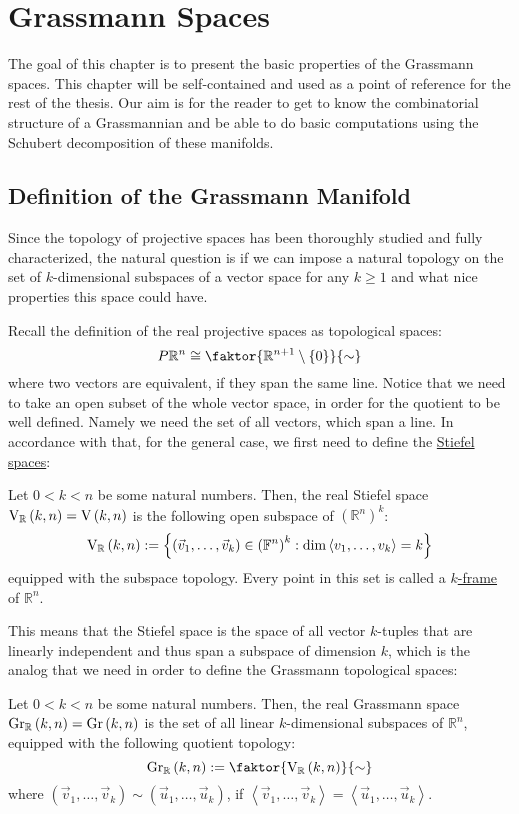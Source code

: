 \chapter{Grassmann Spaces}
The goal of this chapter is to present the basic properties of the Grassmann spaces. This chapter will be self-contained and used as a point of reference for the rest of the thesis. Our aim is for the reader to get to know the combinatorial structure of a Grassmannian and be able to do basic computations using the Schubert decomposition of these manifolds. 

\section{Definition of the Grassmann Manifold}
Since the topology of projective spaces has been thoroughly studied and fully characterized, the natural question is if we can impose a natural topology on the set of $k$-dimensional subspaces of a vector space for any $k\geq1$ and what nice properties this space could have.

Recall the definition of the real projective spaces as topological spaces:
$$P\mathbb{R}^n\cong\faktor{\mathbb{R}^{n+1}\setminus\{0\}}{\sim}$$
where two vectors are equivalent, if they span the same line. Notice that we need to take an open subset of the whole vector space, in order for the quotient to be well defined. Namely we need the set of all vectors, which span a line. In accordance with that, for the general case, we first need to define the \ul{Stiefel spaces}:

\begin{definition} Let $0<k<n$ be some natural numbers. Then, the real Stiefel space $\St{k}{n}{\mathbb{R}}=\St{k}{n}$ is the following open subspace of $\left(\mathbb{R}^n\right)^k$:
$$\St{k}{n}{\mathbb{R}}:=\left\{\left(\vec{v}_1,\ldots,\vec{v}_k\right)\in\left(\mathbb{F}^n\right)^k:\dim\left<v_1,\ldots,v_k\right>=k\right\}$$
equipped with the subspace topology. Every point in this set is called a \ul{$k$-frame} of $\mathbb{R}^n$.
\end{definition}

This means that the Stiefel space is the space of all vector $k$-tuples that are linearly independent and thus span a subspace of dimension $k$, which is the analog that we need in order to define the Grassmann topological spaces:

\begin{definition} Let $0<k<n$ be some natural numbers. Then, the real Grassmann space $\Gr{k}{n}{\mathbb{R}}=\Gr{k}{n}$ is the set of all linear $k$-dimensional subspaces of $\mathbb{R}^n$, equipped with the following quotient topology:
$$\Gr{k}{n}{\mathbb{R}}:=\faktor{\St{k}{n}{\mathbb{R}}}{\sim}$$
where $(\vec{v}_1,\ldots,\vec{v}_k)\sim(\vec{u}_1,\ldots,\vec{u}_k)$, if $\left<\vec{v}_1,\ldots,\vec{v}_k\right>=\left<\vec{u}_1,\ldots,\vec{u}_k\right>$.
\end{definition}

